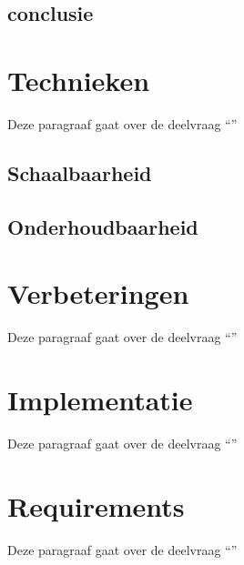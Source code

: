 \subsection{conclusie}

\section{Technieken}
Deze paragraaf gaat over de deelvraag \enquote{\deeltechnieken}

\subsection{Schaalbaarheid}

\subsection{Onderhoudbaarheid}

\section{Verbeteringen}
Deze paragraaf gaat over de deelvraag \enquote{\deelverbetering}


\section{Implementatie}
Deze paragraaf gaat over de deelvraag \enquote{\deelimplementatie}


\section{Requirements}
Deze paragraaf gaat over de deelvraag \enquote{\deelrequirements}